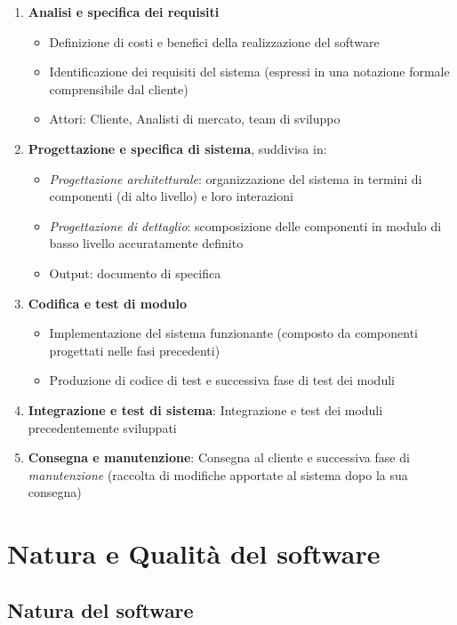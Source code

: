 \begin{enumerate}
    \item \textbf{Analisi e specifica dei requisiti}
    \begin{itemize}
        \item Definizione di costi e benefici della realizzazione del software
        \item Identificazione dei requisiti del sistema (espressi in una notazione formale comprensibile dal cliente)
        \item Attori: Cliente, Analisti di mercato, team di sviluppo
    \end{itemize}
    \item \textbf{Progettazione e specifica di sistema}, suddivisa in:
    \begin{itemize}
        \item \textit{Progettazione architetturale}: organizzazione del sistema in termini di componenti (di alto livello) e loro interazioni
        \item \textit{Progettazione di dettaglio}: scomposizione delle componenti in modulo di basso livello accuratamente definito
        \item Output: documento di specifica
    \end{itemize}
    \item \textbf{Codifica e test di modulo}
    \begin{itemize}
        \item Implementazione del sistema funzionante (composto da componenti progettati nelle fasi precedenti)
        \item Produzione di codice di test e successiva fase di test dei moduli
    \end{itemize}
    \item \textbf{Integrazione e test di sistema}: Integrazione e test dei moduli precedentemente sviluppati
    \item \textbf{Consegna e manutenzione}: Consegna al cliente e successiva fase di \textit{manutenzione} (raccolta di modifiche apportate al sistema dopo la sua consegna)
\end{enumerate}

\section{Natura e Qualità del software}

\subsection{Natura del software}

